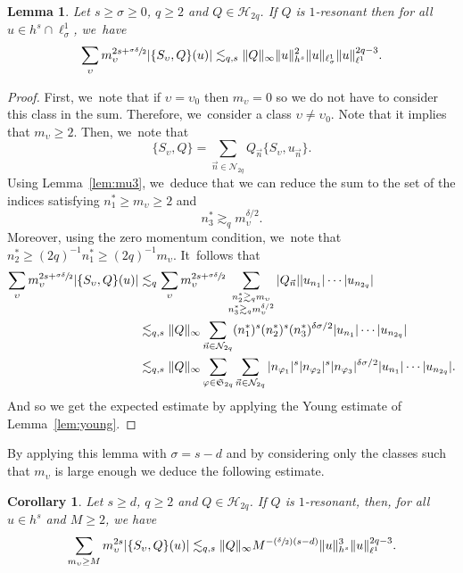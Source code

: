 \documentclass[JEP,XML,SOM,Unicode,published]{cedram}
\newcommand{\Psfrac}[2]{(\sfrac{#1}{#2})}
\theoremstyle{plain}
\newtheorem{corollary}[theorem]{Corollary}
\newtheorem{lemma}[theorem]{Lemma}
\theoremstyle{definition}
\newcommand{\1}{\mathbf{1}}
\begin{document}
\begin{lemma} Let $s\geq \sigma \geq 0$, $q\geq 2$ and $Q\in\mathcal{H}_{2q}$. If $Q$ is $1$-resonant then for all $u\in h^{s} \cap \ell^1_\sigma$, we~have
\[
\sum_{\upsilon} m_\upsilon^{2s+\sfrac{\sigma \delta}2} |\{S_{\upsilon},Q\}(u)| \lesssim_{q,s} \|Q\|_{\infty} \|u\|_{h^{s}}^{2} \| u \|_{\ell^1_\sigma} \|u\|_{\ell^{1}}^{2q-3}.
\]
\end{lemma}
\begin{proof} First, we~note that if $\upsilon = \upsilon_0$ then $m_\upsilon = 0$ so we do not have to consider this class in the sum. Therefore, we~consider a class $\upsilon \neq \upsilon_0$. Note that it implies that $m_{\upsilon} \geq 2.$ Then, we~note that
\[
\{S_{\upsilon},Q\} = \sum_{\vec{n}\in\mathcal{N}_{2q}} Q_{\vec{n}} \{S_\upsilon, u_{\vec{n}} \}.
\]
Using Lemma~\ref{lem:mu3}, we~deduce that we can reduce the sum to the set of the indices satisfying $n_{1}^{\ast}\geq m_\upsilon \geq 2$ and
\[
n_{3}^{\ast}\gtrsim_{q}m_\upsilon^{\delta/2}.
\]
Moreover, using the zero momentum condition, we~note that $n_{2}^{\ast}\geq (2q)^{-1} n_1^\ast \geq (2q)^{-1} m_\upsilon$. It~follows that
\begin{align*}
\sum_{\upsilon } m_\upsilon^{2s+\sfrac{\sigma \delta}2}|\{S_{\upsilon},Q\}(u)|
&\lesssim_q \sum_{\upsilon} m_\upsilon^{2s+\sfrac{\sigma \delta}2} \sum_{\substack{n_{2}^{\ast} \gtrsim_q m_\upsilon \\ n_{3}^{\ast} \gtrsim_{q} m_\upsilon^{\delta/2} }}|Q_{\vec{n}}||u_{n_1}| \cdots |u_{n_{2q}}| \\
&\lesssim_{q,s} \| Q\|_{\infty} \sum_{\vec{n}\in\mathcal{N}_{2q}} (n_{1}^{\ast})^{s} (n_{2}^{\ast})^{s} (n_{3}^{\ast})^{\delta \sigma /2} |u_{n_{1}}|\cdots |u_{n_{2q}}| \\
&\lesssim_{q,s} \| Q\|_{\infty} \sum_{\varphi \in \mathfrak{S}_{2q}} \sum_{\vec{n}\in\mathcal{N}_{2q}} |n_{\varphi_1}|^{s} |n_{\varphi_2}|^{s} |n_{\varphi_3}|^{\delta \sigma /2} |u_{n_{1}}|\cdots |u_{n_{2q}}|.
\end{align*}
And so we get the expected estimate by applying the Young estimate of Lemma~\ref{lem:young}.
\end{proof}

By applying this lemma with $\sigma = s-d$ and by considering only the classes such that $m_\upsilon$ is large enough we deduce the following estimate.
\begin{corollary}
\label{cor:super}Let $s\geq d$, $q\geq 2$ and $Q\in\mathcal{H}_{2q}$. If $Q$ is $1$-resonant, then, for all $u\in h^{s}$ and $M\geq 2$, we have
\begin{equation}
\label{eq:super}
\sum_{m_\upsilon \geq M} m_\upsilon^{2s} |\{S_{\upsilon},Q\}(u)| \lesssim_{q,s} \|Q\|_{\infty} M^{-\Psfrac{\delta}{2}(s-d)}\|u\|_{h^{s}}^{3} \|u\|_{\ell^{1}}^{2q-3}.
\end{equation}
\end{corollary}
\end{document}
